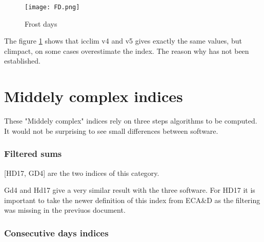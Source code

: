 \documentclass[a4paper,11pt]{article}
\begin{document}
    \begin{figure}[!hbt]
        \centering
        \texttt{[image: FD.png]}
        \caption{Frost days}
        \label{figure/fd}
    \end{figure}
    
    The figure \ref{figure/fd} shows that icclim v4 and v5 gives exactly the same values, but climpact, on some cases overestimate the index.
    The reason why has not been established.
    
\part{Middely complex indices}
    These "Middely complex" indices rely on three steps algorithms
    to be computed.
    It would not be surprising to see small differences between software.

\section{Filtered sums}
    [HD17, GD4] are the two indices of this category.

    Gd4 and Hd17 give a very similar result with the three software.
    For HD17 it is important to take the newer definition of this index from ECA&D as the filtering was missing in the previuos document.

\section{Consecutive days indices}
\end{document}
